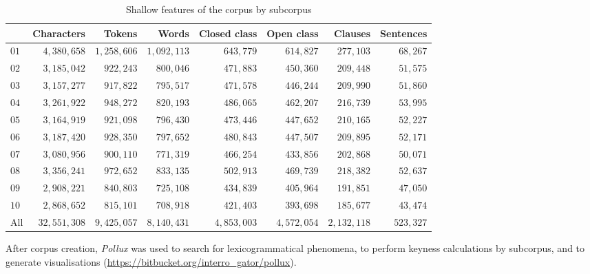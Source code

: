 \documentclass{article}
\begin{document}
\begin{table}[htb]
\centering
\small
\begin{tabular}{lrrrrrrr}
\toprule
{} &  Characters &   Tokens &    Words &  Closed class &  Open class &  Clauses &  Sentences \\
\midrule
$01$ &     $4,380,658$ & $1,258,606$   &  $1,092,113$ &        $643,779$ &      $614,827$ &   $277,103$ &      $68,267$ \\
$02$ &     $3,185,042$ &   $922,243$   &    $800,046$ &        $471,883$ &      $450,360$ &   $209,448$ &      $51,575$ \\
$03$ &     $3,157,277$ &   $917,822$   &    $795,517$ &        $471,578$ &      $446,244$ &   $209,990$ &      $51,860$ \\
$04$ &     $3,261,922$ &   $948,272$   &    $820,193$ &        $486,065$ &      $462,207$ &   $216,739$ &      $53,995$ \\
$05$ &     $3,164,919$ &   $921,098$   &    $796,430$ &        $473,446$ &      $447,652$ &   $210,165$ &      $52,227$ \\
$06$ &     $3,187,420$ &   $928,350$   &    $797,652$ &        $480,843$ &      $447,507$ &   $209,895$ &      $52,171$ \\
$07$ &     $3,080,956$ &   $900,110$   &    $771,319$ &        $466,254$ &      $433,856$ &   $202,868$ &      $50,071$ \\
$08$ &     $3,356,241$ &   $972,652$   &    $833,135$ &        $502,913$ &      $469,739$ &   $218,382$ &      $52,637$ \\
$09$ &     $2,908,221$ &   $840,803$   &    $725,108$ &        $434,839$ &      $405,964$ &   $191,851$ &      $47,050$ \\
$10$ &     $2,868,652$ &   $815,101$   &    $708,918$ &        $421,403$ &      $393,698$ &   $185,677$ &      $43,474$ \\
All &     $32,551,308$ &   $9,425,057$ &    $8,140,431$  &   $4,853,003$ &     $4,572,054$ &   $2,132,118$ & $523,327$ \\
\bottomrule
\end{tabular}
\caption{Shallow features of the corpus by subcorpus}
\label{tab:shallow_P}
\end{table}

After corpus creation, \emph{Pollux} was used to search for lexicogrammatical phenomena, to perform keyness calculations by subcorpus, and to generate visualisations (\url{https://bitbucket.org/interro_gator/pollux}).

\end{document}
